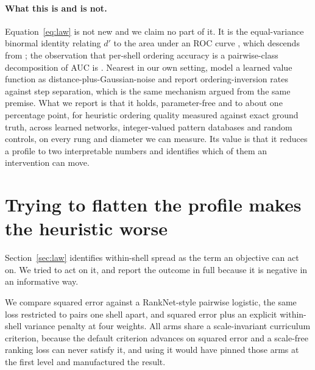 \documentclass{article}
\begin{document}
\paragraph{What this is and is not.} Equation~\ref{eq:law} is not new and we
claim no part of it. It is the equal-variance binormal identity relating $d'$ to
the area under an ROC curve \citep{hanley1982}, which descends from
\citet{thurstone1927}; the observation that per-shell ordering accuracy is a
pairwise-class decomposition of AUC is \citet{hand2001}. Nearest in our own
setting, \citet{czechowski2021} model a learned value function as
distance-plus-Gaussian-noise and report ordering-inversion rates against step
separation, which is the same mechanism argued from the same premise. What we report is that it holds, parameter-free
and to about one percentage point, for heuristic ordering quality measured
against exact ground truth, across learned networks, integer-valued pattern
databases and random controls, on every rung and diameter we can measure. Its
value is that it reduces a profile to two interpretable numbers and identifies
which of them an intervention can move.

\section{Trying to flatten the profile makes the heuristic worse}
\label{sec:losses}

Section~\ref{sec:law} identifies within-shell spread as the term an objective can
act on. We tried to act on it, and report the outcome in full because it is
negative in an informative way.

\begin{table}[t]\centering
\caption{Four training objectives on rung $k=6$, identical in architecture,
budget, seeds and curriculum criterion. Beam width is the smallest reaching a
90\% solve rate; ``curriculum'' is the scramble depth the run reached, out of 40.
Three seeds each; runs that never left the first curriculum level are excluded.}
\label{tab:losses}\end{table}

We compare squared error against a RankNet-style pairwise logistic, the same loss
restricted to pairs one shell apart, and squared error plus an explicit
within-shell variance penalty at four weights. All arms share a scale-invariant
curriculum criterion, because the default criterion advances on squared error and
a scale-free ranking loss can never satisfy it, and using it would have pinned
those arms at the first level and manufactured the result.
\end{document}
